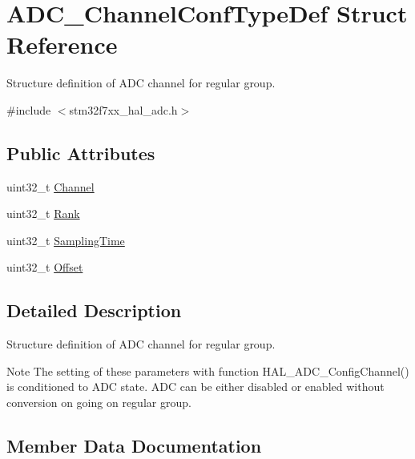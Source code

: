 \hypertarget{struct_a_d_c___channel_conf_type_def}{}\section{A\+D\+C\+\_\+\+Channel\+Conf\+Type\+Def Struct Reference}
\label{struct_a_d_c___channel_conf_type_def}


Structure definition of A\+DC channel for regular group.  




{\ttfamily \#include $<$stm32f7xx\+\_\+hal\+\_\+adc.\+h$>$}

\subsection*{Public Attributes}
\begin{DoxyCompactItemize}
\item 
uint32\+\_\+t \mbox{\hyperlink{struct_a_d_c___channel_conf_type_def_a771e64a3695f61cb1cce4fd65e956f6b}{Channel}}
\item 
uint32\+\_\+t \mbox{\hyperlink{struct_a_d_c___channel_conf_type_def_a106e52a928aefb7778802bac0b75cf2d}{Rank}}
\item 
uint32\+\_\+t \mbox{\hyperlink{struct_a_d_c___channel_conf_type_def_ae9486a657d515b87e2c2853db59afaaa}{Sampling\+Time}}
\item 
uint32\+\_\+t \mbox{\hyperlink{struct_a_d_c___channel_conf_type_def_a481e92707be00870f495e8a63c6cc788}{Offset}}
\end{DoxyCompactItemize}


\subsection{Detailed Description}
Structure definition of A\+DC channel for regular group. 

\begin{DoxyNote}{Note}
The setting of these parameters with function H\+A\+L\+\_\+\+A\+D\+C\+\_\+\+Config\+Channel() is conditioned to A\+DC state. A\+DC can be either disabled or enabled without conversion on going on regular group. 
\end{DoxyNote}


\subsection{Member Data Documentation}
\mbox{\label{struct_a_d_c___channel_conf_type_def_a771e64a3695f61cb1cce4fd65e956f6b}} 
